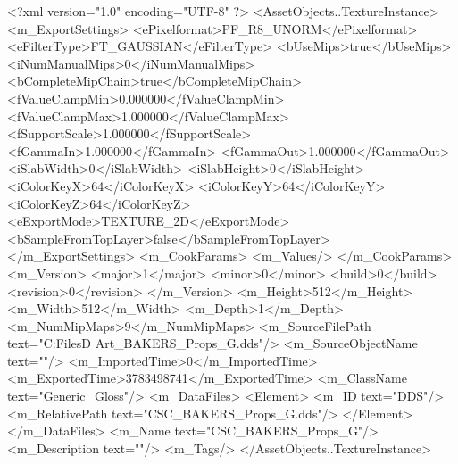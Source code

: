 <?xml version="1.0" encoding="UTF-8" ?>
<AssetObjects..TextureInstance>
	<m_ExportSettings>
		<ePixelformat>PF_R8_UNORM</ePixelformat>
		<eFilterType>FT_GAUSSIAN</eFilterType>
		<bUseMips>true</bUseMips>
		<iNumManualMips>0</iNumManualMips>
		<bCompleteMipChain>true</bCompleteMipChain>
		<fValueClampMin>0.000000</fValueClampMin>
		<fValueClampMax>1.000000</fValueClampMax>
		<fSupportScale>1.000000</fSupportScale>
		<fGammaIn>1.000000</fGammaIn>
		<fGammaOut>1.000000</fGammaOut>
		<iSlabWidth>0</iSlabWidth>
		<iSlabHeight>0</iSlabHeight>
		<iColorKeyX>64</iColorKeyX>
		<iColorKeyY>64</iColorKeyY>
		<iColorKeyZ>64</iColorKeyZ>
		<eExportMode>TEXTURE_2D</eExportMode>
		<bSampleFromTopLayer>false</bSampleFromTopLayer>
	</m_ExportSettings>
	<m_CookParams>
		<m_Values/>
	</m_CookParams>
	<m_Version>
		<major>1</major>
		<minor>0</minor>
		<build>0</build>
		<revision>0</revision>
	</m_Version>
	<m_Height>512</m_Height>
	<m_Width>512</m_Width>
	<m_Depth>1</m_Depth>
	<m_NumMipMaps>9</m_NumMipMaps>
	<m_SourceFilePath text="C:\Users\Shadow\Desktop\Working Files\3D Art\Props\Bakers\CSC_BAKERS_Props_G.dds"/>
	<m_SourceObjectName text=""/>
	<m_ImportedTime>0</m_ImportedTime>
	<m_ExportedTime>3783498741</m_ExportedTime>
	<m_ClassName text="Generic_Gloss"/>
	<m_DataFiles>
		<Element>
			<m_ID text="DDS"/>
			<m_RelativePath text="CSC_BAKERS_Props_G.dds"/>
		</Element>
	</m_DataFiles>
	<m_Name text="CSC_BAKERS_Props_G"/>
	<m_Description text=""/>
	<m_Tags/>
</AssetObjects..TextureInstance>

